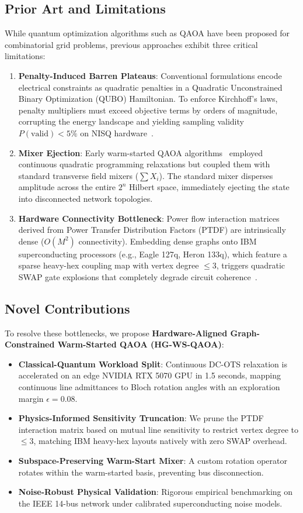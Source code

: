 \documentclass[conference]{IEEEtran}
\begin{document}
\subsection{Prior Art and Limitations}
While quantum optimization algorithms such as QAOA have been proposed for combinatorial grid problems, previous approaches exhibit three critical limitations:
\begin{enumerate}
    \item \textbf{Penalty-Induced Barren Plateaus}: Conventional formulations encode electrical constraints as quadratic penalties in a Quadratic Unconstrained Binary Optimization (QUBO) Hamiltonian. To enforce Kirchhoff's laws, penalty multipliers must exceed objective terms by orders of magnitude, corrupting the energy landscape and yielding sampling validity $P(\text{valid}) < 5\%$ on NISQ hardware~\cite{montanez2025review}.
    \item \textbf{Mixer Ejection}: Early warm-started QAOA algorithms~\cite{egger2021warm} employed continuous quadratic programming relaxations but coupled them with standard transverse field mixers ($\sum X_i$). The standard mixer disperses amplitude across the entire $2^n$ Hilbert space, immediately ejecting the state into disconnected network topologies.
    \item \textbf{Hardware Connectivity Bottleneck}: Power flow interaction matrices derived from Power Transfer Distribution Factors (PTDF) are intrinsically dense ($O(M^2)$ connectivity). Embedding dense graphs onto IBM superconducting processors (e.g., Eagle 127q, Heron 133q), which feature a sparse heavy-hex coupling map with vertex degree $\le 3$, triggers quadratic SWAP gate explosions that completely degrade circuit coherence~\cite{brandhofer2023benchmarking}.
\end{enumerate}

\subsection{Novel Contributions}
To resolve these bottlenecks, we propose \textbf{Hardware-Aligned Graph-Constrained Warm-Started QAOA (HG-WS-QAOA)}:
\begin{itemize}
    \item \textbf{Classical-Quantum Workload Split}: Continuous DC-OTS relaxation is accelerated on an edge NVIDIA RTX 5070 GPU in 1.5 seconds, mapping continuous line admittances to Bloch rotation angles with an exploration margin $\epsilon = 0.08$.
    \item \textbf{Physics-Informed Sensitivity Truncation}: We prune the PTDF interaction matrix based on mutual line sensitivity to restrict vertex degree to $\le 3$, matching IBM heavy-hex layouts natively with zero SWAP overhead.
    \item \textbf{Subspace-Preserving Warm-Start Mixer}: A custom rotation operator rotates within the warm-started basis, preventing bus disconnection.
    \item \textbf{Noise-Robust Physical Validation}: Rigorous empirical benchmarking on the IEEE 14-bus network under calibrated superconducting noise models.
\end{itemize}
\end{document}
